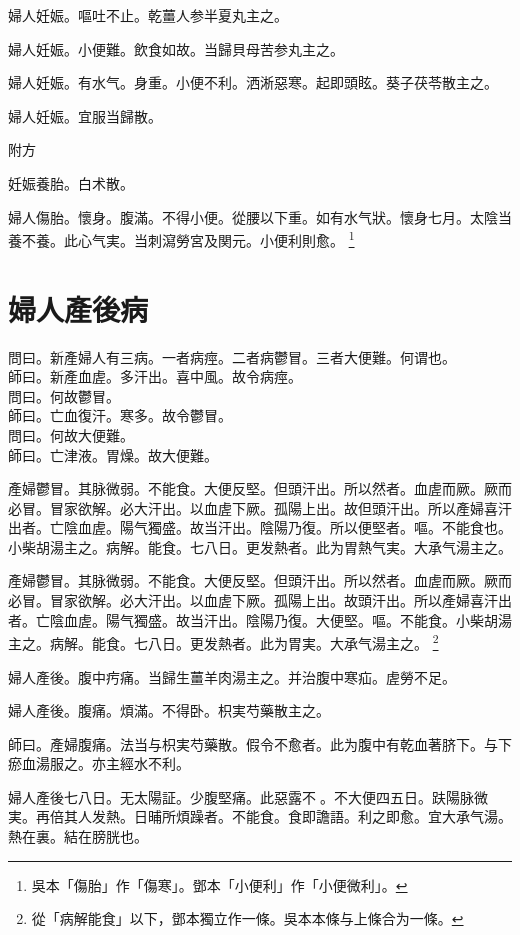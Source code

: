{\khaaitp 婦人}妊娠。嘔吐不止。乾薑人参半夏丸主之。

{\khaaitp 婦人}妊娠。小便難。飲食如故。{\khaaitp 当}歸{\khaaitp 貝}母苦参丸主之。

{\khaaitp 婦人}妊娠。有水气。身重。小便不利。洒淅惡寒。起即頭眩。葵子茯苓散主之。

婦人妊娠。宜服当歸散。

附方

妊娠養胎。白术散。

婦人傷胎。懷身。腹滿。不得小便。從腰以下重。如有水气狀。懷身七月。太陰当養不養。此心气実。当刺瀉勞宮及関元。小便利則愈。
	\footnote{吳本「傷胎」作「傷寒」。鄧本「小便利」作「小便微利」。}

\chapter{婦人產後病}

問曰。新產婦人有三病。一者病痙。二者病鬱冒。三者大便難。何谓也。\\
師曰。新產血虗。多汗出。喜中風。故令病痙。\\
{\khaaitp 問曰。何故鬱冒。}\\
{\khaaitp 師曰。}亡血復汗。寒多。故令鬱冒。\\
{\khaaitp 問曰。何故大便難。}\\
{\khaaitp 師曰。}亡津液。胃燥。故大便難。

產婦鬱{\khaaitp 冒}。其脉微弱。不能食。大便反堅。但頭汗出。所以然者。血虗而厥。厥而必冒。冒家欲解。必大汗出。以血虗下厥。孤陽上出。故但頭汗出。所以產婦喜汗出者。亡陰血虗。陽气獨盛。故当汗出。陰陽乃復。所以便堅者。嘔。不能食也。小柴胡湯主之。病解。能食。七八日。更发熱者。此为胃熱气実。大承气湯主之。{\wuben}

產婦鬱冒。其脉微弱。不能食。大便反堅。但頭汗出。所以然者。血虗而厥。厥而必冒。冒家欲解。必大汗出。以血虗下厥。孤陽上出。故頭汗出。所以產婦喜汗出者。亡陰血虗。陽气獨盛。故当汗出。陰陽乃復。大便堅。嘔。不能食。小柴胡湯主之。病解。能食。七八日。更发熱者。此为胃実。大承气湯主之。{\dengben}
	\footnote{從「病解能食」以下，鄧本獨立作一條。吳本本條与上條合为一條。}

{\khaaitp 婦人}產後。腹中㽲痛。当歸生薑羊肉湯主之。并治腹中寒疝。虗勞不足。

{\khaaitp 婦人}產後。腹痛。煩滿。不得卧。枳実芍藥散主之。

師曰。產婦腹痛。法当与枳実芍藥散。假令不愈者。此为腹中有乾血著脐下。与下瘀血湯服之。{\khaaitp 亦}主經水不利。

婦人產後七八日。无太陽証。少腹堅痛。此惡露不{\sungtpii 𥁞}。不大便四五日。趺陽脉微実。再倍其人发熱。日晡所煩躁者。不{\khaaitp 能}食。食即譫語。利之即愈。宜大承气湯。熱在裏。結在膀胱也。{\wuben}

